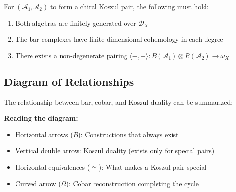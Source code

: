 \begin{theorem}\label{thm:koszul-necessary}
For $(\mathcal{A}_1, \mathcal{A}_2)$ to form a chiral Koszul pair, the following must hold:
\begin{enumerate}
\item Both algebras are finitely generated over $\mathcal{D}_X$
\item The bar complexes have finite-dimensional cohomology in each degree
\item There exists a non-degenerate pairing $\langle -, - \rangle: \bar{B}(\mathcal{A}_1) \otimes \bar{B}(\mathcal{A}_2) \to \omega_X$
\end{enumerate}
\end{theorem}

\subsection{Diagram of Relationships}

The relationship between bar, cobar, and Koszul duality can be summarized:

\begin{center}
\end{center}

\textbf{Reading the diagram:}
\begin{itemize}
\item Horizontal arrows ($\bar{B}$): Constructions that always exist
\item Vertical double arrow: Koszul duality (exists only for special pairs)
\item Horizontal equivalences ($\simeq$): What makes a Koszul pair special
\item Curved arrow ($\Omega$): Cobar reconstruction completing the cycle
\end{itemize}

